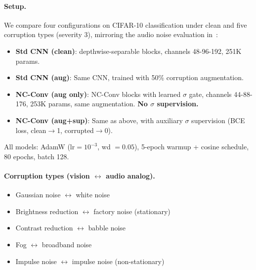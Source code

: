\documentclass[10pt,twocolumn,letterpaper]{article}
\begin{document}
\paragraph{Setup.}
We compare four configurations on CIFAR-10 classification under clean and five corruption types (severity 3), mirroring the audio noise evaluation in~\cite{choi2026ncssm}:
\begin{itemize}
\setlength\itemsep{0pt}
\item \textbf{Std CNN (clean)}: depthwise-separable blocks, channels 48-96-192, 251K params.
\item \textbf{Std CNN (aug)}: Same CNN, trained with 50\% corruption augmentation.
\item \textbf{NC-Conv (aug only)}: NC-Conv blocks with learned $\sigma$ gate, channels 44-88-176, 253K params, same augmentation. \textbf{No $\sigma$ supervision.}
\item \textbf{NC-Conv (aug+sup)}: Same as above, with auxiliary $\sigma$ supervision (BCE loss, clean$\to$1, corrupted$\to$0).
\end{itemize}
All models: AdamW ($\text{lr}=10^{-3}$, wd $=0.05$), 5-epoch warmup + cosine schedule, 80 epochs, batch 128.

\paragraph{Corruption types (vision $\leftrightarrow$ audio analog).}
\begin{itemize}
\setlength\itemsep{0pt}
\item Gaussian noise $\leftrightarrow$ white noise
\item Brightness reduction $\leftrightarrow$ factory noise (stationary)
\item Contrast reduction $\leftrightarrow$ babble noise
\item Fog $\leftrightarrow$ broadband noise
\item Impulse noise $\leftrightarrow$ impulse noise (non-stationary)
\end{itemize}
\end{document}

